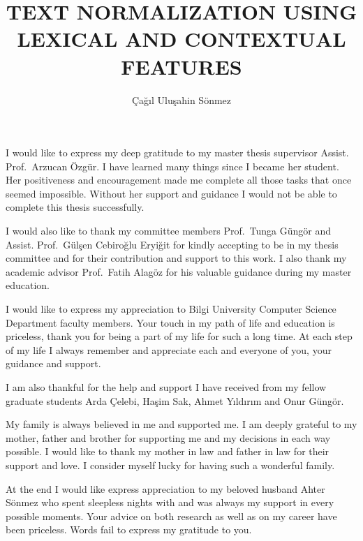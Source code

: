 \documentclass[a4paper,onesided,12pt]{report}
\title{\uppercase{Text Normalization Using Lexical and Contextual Features}}
\author{Çağıl Uluşahin Sönmez}
\begin{document}
\setlength{\abovedisplayskip}{1cm}
\setlength{\belowdisplayskip}{1cm}

\makemstitle %
\makeapprovalpage
\begin{acknowledgements}
I would like to express my deep gratitude to my master thesis supervisor Assist. Prof.~Arzucan Özgür. I have learned many things since I became her student. Her positiveness and encouragement made me complete all those tasks that once seemed impossible. Without her support and guidance I would not be able to complete this thesis successfully.

I would also like to thank my committee members Prof.~Tunga Güngör and Assist. Prof.~Gülşen Cebiroğlu Eryiğit for kindly accepting to be in my thesis committee and for their contribution and support to this work. I also thank my academic advisor Prof.~Fatih Alagöz for his valuable guidance during my master education.

I would like to express my appreciation to Bilgi University Computer Science Department faculty members. Your touch in my path of life and education is priceless, thank you for being a part of my life for such a long time. At each step of my life I always remember and appreciate each and everyone of you, your guidance and support.

I am also thankful for the help and support I have received from my fellow graduate students Arda Çelebi, Haşim Sak, Ahmet Yıldırım and Onur Güngör.

My family is always believed in me and supported me. I am deeply grateful to my mother, father and brother for supporting me and my decisions in each way possible. I would like to thank my mother in law and father in law for their support and love. I consider myself lucky for having such a wonderful family.

At the end I would like express appreciation to my beloved husband Ahter Sönmez who spent sleepless nights with and was always my support in every possible moments. Your advice on both research as well as on my career have been priceless. Words fail to express my gratitude to you.

\end{acknowledgements}
\end{document}
